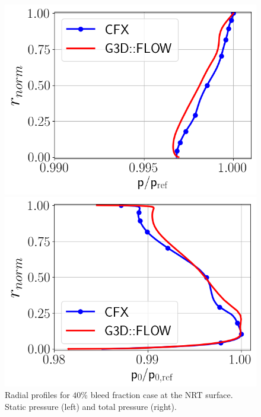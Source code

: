 \begin{figure}[h!]
  \centering
  \begin{minipage}{0.48\columnwidth}
  \includegraphics[width=1.\textwidth]{figures/PAaveB40_NRT.png}
  \end{minipage}
  \begin{minipage}{0.48\columnwidth}
  \includegraphics[width=1.\textwidth]{figures/P0MaveB40_NRT.png}
  \end{minipage}
  \caption{Radial profiles for $40\%$ bleed fraction case at the NRT surface. Static pressure (left) and total pressure (right).} \label{fig:NRT40}
\end{figure}

